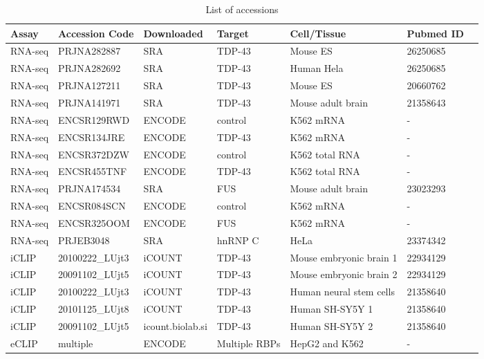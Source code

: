 	
\begin{table}[h!]
	\caption{List of accessions}
	\begin{footnotesize}
		\begin{tabular}{lllllll}
			Assay & Accession Code & Downloaded & Target & Cell/Tissue & Pubmed ID\\
			\hline
			RNA-seq & PRJNA282887 & SRA\footnotemark & TDP-43 & Mouse ES  & 26250685 \\
			RNA-seq & PRJNA282692 & SRA & TDP-43 & Human Hela & 26250685 \\
			RNA-seq & PRJNA127211 & SRA & TDP-43 & Mouse ES & 20660762\\
			RNA-seq & PRJNA141971 & SRA & TDP-43 & Mouse adult brain & 21358643 \\
			RNA-seq & ENCSR129RWD & ENCODE\footnotemark & control & K562 mRNA & -\\
			RNA-seq & ENCSR134JRE & ENCODE & TDP-43 & K562 mRNA & -\\
			RNA-seq & ENCSR372DZW & ENCODE & control & K562 total RNA & -\\
			RNA-seq & ENCSR455TNF & ENCODE & TDP-43 & K562 total RNA & -\\
			RNA-seq & PRJNA174534 & SRA & FUS & Mouse adult brain & 23023293 \\
			RNA-seq & ENCSR084SCN & ENCODE & control & K562 mRNA & -\\
			RNA-seq & ENCSR325OOM & ENCODE & FUS & K562 mRNA & -\\
			RNA-seq & PRJEB3048 & SRA & hnRNP C & HeLa & 23374342 \\
			iCLIP & 20100222\_LUjt3 & iCOUNT\footnotemark & TDP-43 & Mouse embryonic brain 1 & 22934129\\
			iCLIP & 20091102\_LUjt5	& iCOUNT & TDP-43 & Mouse embryonic brain 2 & 22934129\\
			iCLIP & 20100222\_LUjt3 & iCOUNT & TDP-43 & Human neural stem cells & 21358640\\
			iCLIP & 20101125\_LUjt8 & iCOUNT & TDP-43 & Human SH-SY5Y 1 & 21358640\\
			iCLIP & 20091102\_LUjt5 & icount.biolab.si & TDP-43 & Human SH-SY5Y 2 & 21358640\\
			eCLIP & multiple & ENCODE & Multiple RBPs & HepG2 and K562 & -
		\end{tabular}
	\end{footnotesize}
\end{table}

